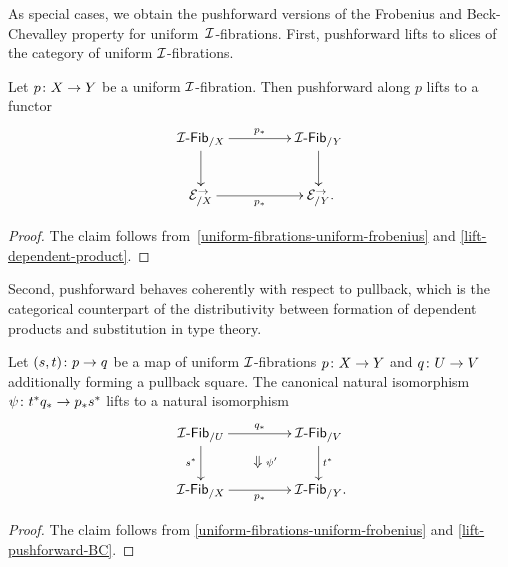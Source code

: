 \documentclass[reqno,10pt,a4paper,oneside,draft]{amsart}
\begin{document}
As special cases, we obtain the pushforward versions of the Frobenius and Beck-Chevalley property for uniform~$\cal{I}$-fibrations.
First, pushforward lifts to slices of the category of uniform $\cal{I}$-fibrations.

\begin{corollary} \label{uniform-fibrations-frobenius-pushforward}
Let $p \co X \to Y$ be a uniform $\cal{I}$-fibration.
Then pushforward along $p$ lifts to a functor
\[
\xymatrix@C+2em{
  \Fib{\cal{I}}_{/X}
  \ar[r]^{p_*}
  \ar[d]
&
  \Fib{\cal{I}}_{/Y}
  \ar[d]
\\
  \catE_{/X}^\to
  \ar[r]_{p_*}
&
  \catE_{/Y}^\to
\rlap{.}}
\]
\end{corollary}

\begin{proof}
The claim follows from~\cref{uniform-fibrations-uniform-frobenius} and \cref{lift-dependent-product}.
\end{proof}

Second, pushforward behaves coherently with respect to pullback, which is the categorical counterpart of the distributivity between formation of dependent products and substitution in type theory.

\begin{corollary} \label{uniform-fibrations-BC-pushforward}
Let $(s, t) \co p \to q$ be a map of uniform $\cal{I}$-fibrations $p \co X \to Y$ and $q \co U \to V$ additionally forming a pullback square.
The canonical natural isomorphism $\psi \co t^* q_* \to p_* s^*$ lifts to a natural isomorphism
\[
\xymatrix@C+2em{
  \Fib{\cal{I}}_{/U}
  \ar[r]^{q_*}
  \ar[d]_{s^*}
  \ar@{}[dr]|{\textstyle\Downarrow \rlap{$\labelstyle \psi'$}}
&
  \Fib{\cal{I}}_{/V}
  \ar[d]^{t^*}
\\
  \Fib{\cal{I}}_{/X}
  \ar[r]_{p_*}
&
  \Fib{\cal{I}}_{/Y}
\rlap{.}}
\]
\end{corollary}

\begin{proof}
The claim follows from \cref{uniform-fibrations-uniform-frobenius} and \cref{lift-pushforward-BC}.
\end{proof}
\end{document}
